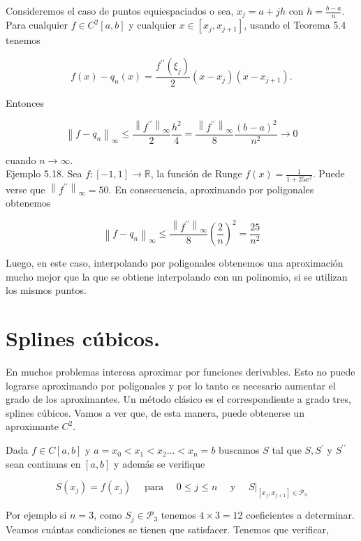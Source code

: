 \documentclass[10pt]{book}
\begin{document}
Consideremos el caso de puntos equiespaciados o sea, $x_{j}=a+j h$ con $h=\frac{b-a}{n}$. Para cualquier $f \in C^{2}[a, b]$ y cualquier $x \in\left[x_{j}, x_{j+1}\right]$, usando el Teorema 5.4 tenemos

$$
f(x)-q_{n}(x)=\frac{f^{\prime \prime}\left(\xi_{j}\right)}{2}\left(x-x_{j}\right)\left(x-x_{j+1}\right) .
$$

Entonces

$$
\left\|f-q_{n}\right\|_{\infty} \leq \frac{\left\|f^{\prime \prime}\right\|_{\infty}}{2} \frac{h^{2}}{4}=\frac{\left\|f^{\prime \prime}\right\|_{\infty}}{8} \frac{(b-a)^{2}}{n^{2}} \rightarrow 0
$$

cuando $n \rightarrow \infty$.\\
Ejemplo 5.18. Sea $f:[-1,1] \rightarrow \mathbb{R}$, la función de Runge $f(x)=\frac{1}{1+25 x^{2}}$. Puede verse que $\left\|f^{\prime \prime}\right\|_{\infty}=50$. En consecuencia, aproximando por poligonales obtenemos

$$
\left\|f-q_{n}\right\|_{\infty} \leq \frac{\left\|f^{\prime \prime}\right\|_{\infty}}{8}\left(\frac{2}{n}\right)^{2}=\frac{25}{n^{2}}
$$

Luego, en este caso, interpolando por poligonales obtenemos una aproximación mucho mejor que la que se obtiene interpolando con un polinomio, si se utilizan los mismos puntos.

\section*{Splines cúbicos.}
En muchos problemas interesa aproximar por funciones derivables. Esto no puede lograrse aproximando por poligonales y por lo tanto es necesario aumentar el grado de los aproximantes. Un método clásico es el correspondiente a grado tres, splines cúbicos. Vamos a ver que, de esta manera, puede obtenerse un aproximante $C^{2}$.

Dada $f \in C[a, b]$ y $a=x_{0}<x_{1}<x_{2} \ldots<x_{n}=b$ buscamos $S$ tal que $S, S^{\prime}$ y $S^{\prime \prime}$ sean continuas en $[a, b]$ y además se verifique

$$
S\left(x_{j}\right)=f\left(x_{j}\right) \quad \text { para } \quad 0 \leq j \leq n \quad \text { y }\left.\quad S\right|_{\left[x_{j}, x_{j+1}\right] \in \mathcal{P}_{3}}
$$

Por ejemplo si $n=3$, como $S_{j} \in \mathcal{P}_{3}$ tenemos $4 \times 3=12$ coeficientes a determinar. Veamos cuántas condiciones se tienen que satisfacer. Tenemos que verificar,
\end{document}
